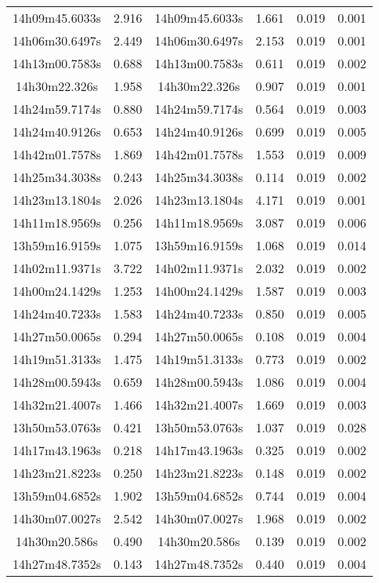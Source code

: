 \begin{table}
\begin{tabular}{cccccc}
14h09m45.6033s & 2.916 & 14h09m45.6033s & 1.661 & 0.019 & 0.001 \\
14h06m30.6497s & 2.449 & 14h06m30.6497s & 2.153 & 0.019 & 0.001 \\
14h13m00.7583s & 0.688 & 14h13m00.7583s & 0.611 & 0.019 & 0.002 \\
14h30m22.326s & 1.958 & 14h30m22.326s & 0.907 & 0.019 & 0.001 \\
14h24m59.7174s & 0.880 & 14h24m59.7174s & 0.564 & 0.019 & 0.003 \\
14h24m40.9126s & 0.653 & 14h24m40.9126s & 0.699 & 0.019 & 0.005 \\
14h42m01.7578s & 1.869 & 14h42m01.7578s & 1.553 & 0.019 & 0.009 \\
14h25m34.3038s & 0.243 & 14h25m34.3038s & 0.114 & 0.019 & 0.002 \\
14h23m13.1804s & 2.026 & 14h23m13.1804s & 4.171 & 0.019 & 0.001 \\
14h11m18.9569s & 0.256 & 14h11m18.9569s & 3.087 & 0.019 & 0.006 \\
13h59m16.9159s & 1.075 & 13h59m16.9159s & 1.068 & 0.019 & 0.014 \\
14h02m11.9371s & 3.722 & 14h02m11.9371s & 2.032 & 0.019 & 0.002 \\
14h00m24.1429s & 1.253 & 14h00m24.1429s & 1.587 & 0.019 & 0.003 \\
14h24m40.7233s & 1.583 & 14h24m40.7233s & 0.850 & 0.019 & 0.005 \\
14h27m50.0065s & 0.294 & 14h27m50.0065s & 0.108 & 0.019 & 0.004 \\
14h19m51.3133s & 1.475 & 14h19m51.3133s & 0.773 & 0.019 & 0.002 \\
14h28m00.5943s & 0.659 & 14h28m00.5943s & 1.086 & 0.019 & 0.004 \\
14h32m21.4007s & 1.466 & 14h32m21.4007s & 1.669 & 0.019 & 0.003 \\
13h50m53.0763s & 0.421 & 13h50m53.0763s & 1.037 & 0.019 & 0.028 \\
14h17m43.1963s & 0.218 & 14h17m43.1963s & 0.325 & 0.019 & 0.002 \\
14h23m21.8223s & 0.250 & 14h23m21.8223s & 0.148 & 0.019 & 0.002 \\
13h59m04.6852s & 1.902 & 13h59m04.6852s & 0.744 & 0.019 & 0.004 \\
14h30m07.0027s & 2.542 & 14h30m07.0027s & 1.968 & 0.019 & 0.002 \\
14h30m20.586s & 0.490 & 14h30m20.586s & 0.139 & 0.019 & 0.002 \\
14h27m48.7352s & 0.143 & 14h27m48.7352s & 0.440 & 0.019 & 0.004 \\

\end{tabular}
\end{table}

